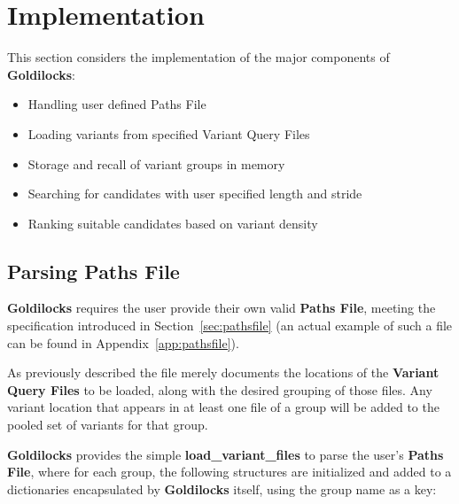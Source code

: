 \section{Implementation}

This section considers the implementation of the major components of
\textbf{Goldilocks}:

\begin{itemize}
    \item Handling user defined Paths File
    \item Loading variants from specified Variant Query Files
    \item Storage and recall of variant groups in memory
    \item Searching for candidates with user specified length and stride
    \item Ranking suitable candidates based on variant density
\end{itemize}

\subsection{Parsing Paths File}
\label{sec:parse-path}

\textbf{Goldilocks} requires the user provide their own valid \textbf{Paths
File}, meeting the specification introduced in Section~\ref{sec:pathsfile} (an
actual example of such a file can be found in Appendix~\ref{app:pathsfile}).

As previously described the file merely documents the locations of the
\textbf{Variant Query Files} to be loaded, along with the desired grouping of
those files. Any variant location that appears in at least one file of a group
will be added to the pooled set of variants for that group.

\textbf{Goldilocks} provides the simple \textbf{load\_variant\_files} to parse
the user's \textbf{Paths File}, where for each group, the following structures are
initialized and added to a dictionaries encapsulated by \textbf{Goldilocks}
itself, using the group name as a key:

